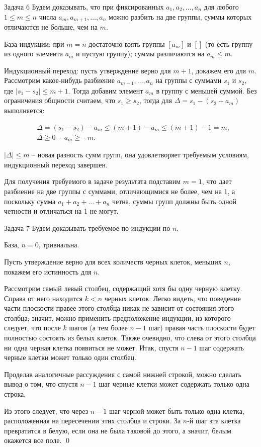 \documentclass{article}
\newcommand{\abs}[1]{\lvert#1\rvert}
\begin{document}
	\begin{section}{Задача 6}
		Будем доказывать, что при фиксированных $a_1, a_2, \dots, a_n$ для любого $1 \le m \le n$ числа $a_m, a_{m+1}, \dots, a_n$ можно разбить на две группы, суммы которых отличаются не больше, чем на $m$.

		База индукции: при $m = n$ достаточно взять группы $[a_m]$ и $[]$ (то есть группу из одного элемента $a_m$ и пустую группу); суммы различаются на $a_m \le m$.

		Индукционный переход: пусть утверждение верно для $m + 1$, докажем его для $m$. Рассмотрим какое-нибудь разбиение $a_{m+1}, \dots, a_n$ на группы с суммами $s_1$ и $s_2$, где $\abs{s_1 - s_2} \le m + 1$. Тогда добавим элемент $a_m$ в группу с меньшей суммой. Без ограничения общности считаем, что $s_1 \ge s_2$, тогда для $\Delta = s_1 - (s_2 + a_m)$ выполняется:

		\begin{align*}
			& \Delta = (s_1 - s_2) - a_m \le (m + 1) - a_m \le (m + 1) - 1 = m, \\
			& \Delta \ge 0 - a_m \ge -m.
		\end{align*}

		$\abs{\Delta} \le m$ -- новая разность сумм групп, она удовлетворяет требуемым условиям, индукционный переход завершен.

		Для получения требуемого в задаче результата подставим $m = 1$, что дает разбиение на две группы с суммами, отличающимися не более, чем на 1, а поскольку сумма $a_1 + a_2 + \dots + a_n$ четна, суммы групп должны быть одной четности и отличаться на 1 не могут.
	\end{section}

	\begin{section}{Задача 7}
		Будем доказывать требуемое по индукции по $n$.

		База, $n = 0$, тривиальна.

		Пусть утверждение верно для всех количеств черных клеток, меньших $n$, покажем его истинность для $n$.

		Рассмотрим самый левый столбец, содержащий хотя бы одну черную клетку. Справа от него находится $k < n$ черных клеток. Легко видеть, что поведение части плоскости правее этого столбца никак не зависит от состояния этого столбца; значит, можно применить предположение индукции, из которого следует, что после $k$ шагов (а тем более $n - 1$ шаг) правая часть плоскости будет полностью состоять из белых клеток. Также очевидно, что слева от этого столбца ни одна черная клетка появиться не может. Итак, спустя $n - 1$ шаг содержать черные клетки может только один столбец.

		Проделав аналогичные рассуждения с самой нижней строкой, можно сделать вывод о том, что спустя $n - 1$ шаг черные клетки может содержать только одна строка.

		Из этого следует, что через $n - 1$ шаг черной может быть только одна клетка, расположенная на пересечении этих столбца и строки. За $n$-й шаг эта клетка превратится в белую, если она не была таковой до этого, а значит, белым окажется все поле. \qed
	\end{section}
\end{document}
